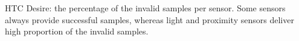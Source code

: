 HTC Desire: the percentage of the invalid samples per sensor. Some sensors always provide successful samples, whereas light and proximity sensors deliver high proportion of the invalid samples. 
